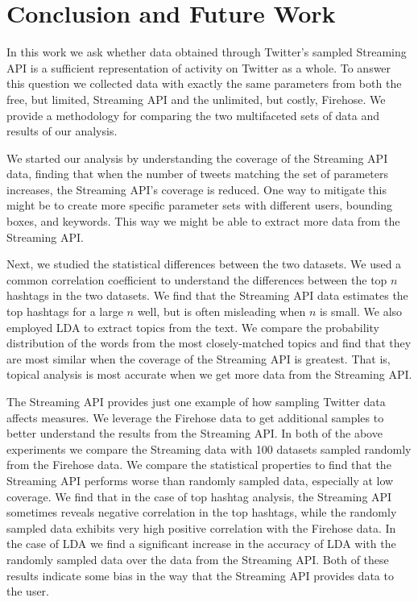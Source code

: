 \documentclass[letterpaper]{article}
\begin{document}
\section{Conclusion and Future Work}
In this work we ask whether data obtained through Twitter's sampled Streaming API is a sufficient representation of activity on Twitter as a whole. To answer this question we collected data with exactly the same parameters from both the free, but limited, Streaming API and the unlimited, but costly, Firehose. We provide a methodology for comparing the two multifaceted sets of data and results of our analysis.

We started our analysis by understanding the coverage of the Streaming API data, finding that when the number of tweets matching the set of parameters increases, the Streaming API's coverage is reduced. One way to mitigate this might be to create more specific parameter sets with different users, bounding boxes, and keywords. This way we might be able to extract more data from the Streaming API.

Next, we studied the statistical differences between the two datasets. We used a common correlation coefficient to understand the differences between the top $n$ hashtags in the two datasets. We find that the Streaming API data estimates the top hashtags for a large $n$ well, but is often misleading when $n$ is small. 
We also employed LDA to extract topics from the text. We compare the probability distribution of the words from the most closely-matched topics and find that they are most similar when the coverage of the Streaming API is greatest. That is, topical analysis is most accurate when we get more data from the Streaming API. 

The Streaming API provides just one example of how sampling Twitter data affects measures. We leverage the Firehose data to get additional samples to better understand the results from the Streaming API. In both of the above experiments we compare the Streaming data with 100 datasets sampled randomly from the Firehose data. We compare the statistical properties to find that the Streaming API performs worse than randomly sampled data, especially at low coverage. We find that in the case of top hashtag analysis, the Streaming API sometimes reveals negative correlation in the top hashtags, while the randomly sampled data exhibits very high positive correlation with the Firehose data. In the case of LDA we find a significant increase in the accuracy of LDA with the randomly sampled data over the data from the Streaming API. Both of these results indicate some bias in the way that the Streaming API provides data to the user.
\end{document}
